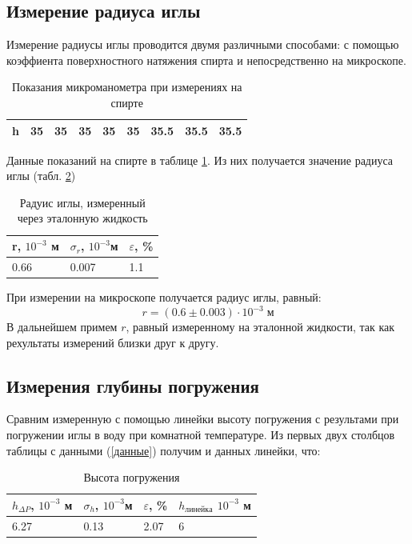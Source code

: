 \documentclass[a4paper,12pt]{article} %
\begin{document}
\subsection*{Измерение радиуса иглы}
Измерение радиусы иглы проводится двумя различными способами: с помощью коэффиента поверхностного натяжения спирта и непосредственно на микроскопе.
 
\begin{table}[h!]
\caption{Показания микроманометра при измерениях на спирте}
\label{спирт}
\begin{tabular}{|l|l|l|l|l|l|l|l|l|}
\hline
h & 35 & 35 & 35 & 35 & 35 & 35.5 & 35.5 & 35.5 \\ \hline
\end{tabular}
\end{table}
Данные показаний на спирте в таблице \ref{спирт}. Из них получается значение радиуса иглы (табл. \ref{радуис_спирт})
\begin{table}[h!]
\caption{Радуис иглы, измеренный через эталонную жидкость}
\label{радуис_спирт}
\begin{tabular}{|l|l|l|}
\hline
r, $10^{-3}$ м & $\sigma_r$,  $10^{-3}$м & $\varepsilon$, \% \\ \hline
0.66           & 0.007                   & 1.1            \\ \hline
\end{tabular}
\end{table}

При измерении на микроскопе получается радиус иглы, равный:
\begin{equation}
r = (0.6 \pm 0.003 )\cdot  10^{-3} \; м
\end{equation}
В дальнейшем примем $r$, равный измеренному на эталонной жидкости, так как рехультаты измерений близки друг к другу.
\subsection*{Измерения глубины погружения}
Сравним измеренную с помощью линейки высоту погружения с результами при погружении иглы в воду при комнатной температуре. 
Из первых двух столбцов таблицы с данными (\ref{данные}) получим и данных линейки, что:
\begin{table}[h!]
\caption{Высота погружения}
\label{высота}
\begin{tabular}{|l|l|l|l|}
\hline
$h_{\Delta P}$, $10^{-3}$ м & $\sigma_h$,  $10^{-3}$м & $\varepsilon$, \% & $h_{линейка}$ $10^{-3}$ м\\ \hline
6.27          & 0.13                   & 2.07    &    6     \\ \hline
\end{tabular}
\end{table}
\end{document}
